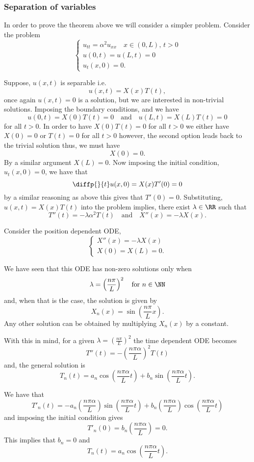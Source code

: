 \documentclass[12pt, a4paper]{article}
\begin{document}
\subsubsection{Separation of variables}

In order to prove the theorem above we will consider a simpler problem. Consider the problem 
\[\begin{cases}
    u_{tt} = \alpha^2 u_{xx} \quad x\in (0,L), \, t>0 \\
    u(0,t)=u(L,t)=0 \\
    u_t(x,0)=0.
\end{cases}\]

Suppose, \(u(x,t)\) is separable i.e.
\[u(x,t)=X(x)T(t),\]
once again \(u(x,t)=0\) is a solution, but we are interested in non-trivial solutions. Imposing the boundary conditions, and we have 
\[u(0,t)=X(0)T(t)=0 \quad \text{and} \quad u(L,t)=X(L)T(t)=0\]
for all \(t>0\). In order to have \(X(0)T(t)=0\) for all \(t>0\) we either have \(X(0)=0\) or \(T(t)=0\) for all \(t>0\) however, the second option leads back to the trivial solution thus, we must have 
\[X(0)=0.\]
By a similar argument \(X(L)=0\). Now imposing the initial condition, \(u_t(x,0)=0\), we have that 
\[\diffp{}{t}u(x,0)=X(x)T'(0)=0\]
by a similar reasoning as above this gives that \(T'(0)=0\). Substituting, \(u(x,t)=X(x)T(t)\) into the problem implies, there exist \(\lambda \in \RR\) such that 
\[T''(t)=-\lambda \alpha^2 T(t) \quad \text{and} \quad X''(x)=-\lambda X(x).\]

Consider the position dependent ODE, 
\[\begin{cases}
    X''(x)=-\lambda X(x) \\
    X(0)=X(L)=0.
\end{cases}\]

We have seen that this ODE has non-zero solutions only when 
\[\lambda = \left( \frac{n\pi}{L} \right)^2 \quad \text{for } n \in \NN\]
and, when that is the case, the solution is given by 
\[X_n(x) = \sin\left( \frac{n\pi}{L}x \right).\]
Any other solution can be obtained by multiplying \(X_n(x)\) by a constant.

With this in mind, for a given \(\lambda = \left( \frac{n\pi}{L} \right)^2\) the time dependent ODE becomes
\[T''(t) =-\left( \frac{n\pi\alpha}{L} \right)^2 T(t)\]
and, the general solution is 
\[T_n(t)=a_n \cos\left( \frac{n\pi\alpha}{L} t\right)+b_n\sin\left( \frac{n\pi\alpha}{L} t\right).\]

We have that 
\[T'_n(t) = -a_n \left( \frac{n\pi\alpha}{L} \right)\sin\left( \frac{n\pi\alpha}{L} t\right)+b_n\left( \frac{n\pi\alpha}{L} \right)\cos\left( \frac{n\pi\alpha}{L} t\right)\]
and imposing the initial condition gives 
\[T'_n(0)=b_n \left( \frac{n\pi\alpha}{L} \right)=0.\]
This implies that \(b_n=0\) and
\[T_n(t)=a_n \cos\left( \frac{n\pi\alpha}{L} t\right).\]
\end{document}
